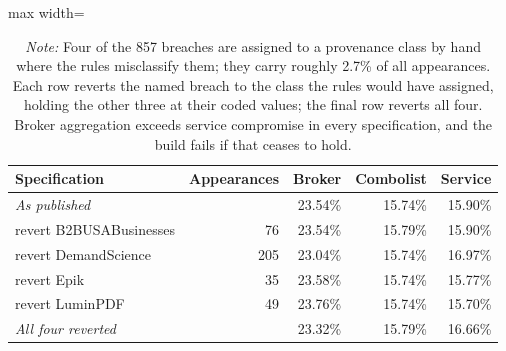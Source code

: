 \begin{table}[!htbp]
\centering
\footnotesize
\def\sym#1{\ifmmode^{#1}\else\(^{#1}\)\fi}
\caption{Provenance shares under alternative treatment of the hand-coded breaches}
\label{tab:sensitivity_taxonomy}
\begin{adjustbox}{max width=\linewidth}
\begin{tabular}{lrrrr}
\toprule\toprule
Specification & Appearances & Broker & Combolist & Service \\
\midrule
\textit{As published} &  & 23.54\% & 15.74\% & 15.90\% \\
\quad revert B2BUSABusinesses &  76 & 23.54\% & 15.79\% & 15.90\% \\
\quad revert DemandScience & 205 & 23.04\% & 15.74\% & 16.97\% \\
\quad revert Epik &  35 & 23.58\% & 15.74\% & 15.77\% \\
\quad revert LuminPDF &  49 & 23.76\% & 15.74\% & 15.70\% \\
\textit{All four reverted} &  & 23.32\% & 15.79\% & 16.66\% \\
\bottomrule
\end{tabular}
\end{adjustbox}
\caption*{\scriptsize \emph{Note:} Four of the 857 breaches are assigned to a provenance class by hand where the rules misclassify them; they carry roughly 2.7\% of all appearances. Each row reverts the named breach to the class the rules would have assigned, holding the other three at their coded values; the final row reverts all four. Broker aggregation exceeds service compromise in every specification, and the build fails if that ceases to hold.}
\end{table}
